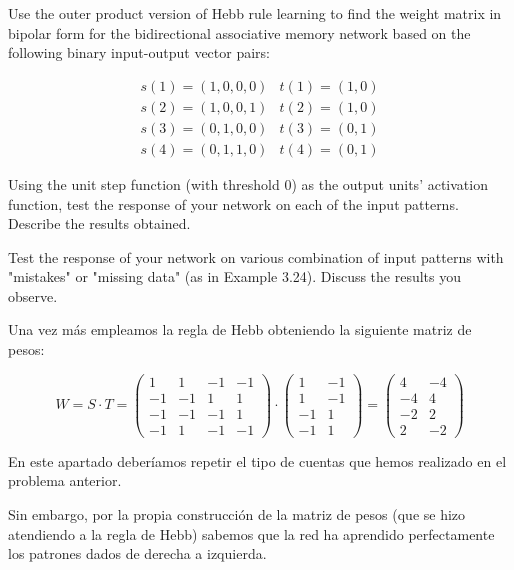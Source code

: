\begin{problem}[11]
\ppart Use the outer product version of Hebb rule learning to find the weight matrix in bipolar form for the bidirectional associative memory network based on the following binary input-output vector pairs:

\[\begin{array}{ll}
s(1)=(1,0,0,0) & t(1)=(1,0)\\
s(2)=(1,0,0,1) & t(2)=(1,0)\\
s(3)=(0,1,0,0) & t(3)=(0,1)\\
s(4)=(0,1,1,0) & t(4)=(0,1)
\end{array}\]

\ppart Using the unit step function (with threshold 0) as the output units' activation function, test the response of your network on each of the input patterns. Describe the results obtained.

\ppart Test the response of your network on various combination of input patterns with "mistakes" or "missing data" (as in Example 3.24). Discuss the results you observe.

\solution


\spart

Una vez más empleamos la regla de Hebb obteniendo la siguiente matriz de pesos:

\[W = S\cdot T = \left( \begin{array}{cccc} 1 & 1 & -1 & -1 \\ -1 & -1 & 1 & 1 \\ -1 & -1 & -1 & 1 \\ -1 & 1 & -1 & -1 \end{array}\right)\cdot \left( \begin{array}{cc} 1 & -1 \\ 1 & -1 \\ -1 & 1 \\ -1 & 1\end{array} \right) = \left(\begin{array}{ccc}
4 & -4 \\ -4 & 4 \\ -2 & 2 \\ 2 & -2 \end{array} \right)\]

\spart

En este apartado deberíamos repetir el tipo de cuentas que hemos realizado en el problema anterior.

Sin embargo, por la propia construcción de la matriz de pesos (que se hizo atendiendo a la regla de Hebb) sabemos que la red ha aprendido perfectamente los patrones dados de derecha a izquierda.


\end{problem}

